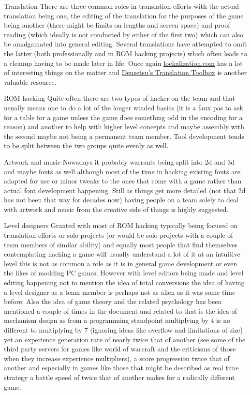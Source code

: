 \documentclass[
]{book}
\begin{document}
Translation There are three common roles in translation efforts with the actual translation being one, the editing of the translation for the purposes of the game being another (there might be limits on lengths and screen space) and proof reading (which ideally is not conducted by either of the first two) which can also be amalgamated into general editing. Several translations have attempted to omit the latter (both professionally and in ROM hacking projects) which often leads to a cleanup having to be made later in life. Once again \href{http://www.loekalization.com/mistakes.html}{loekalization.com} has a lot of interesting things on the matter and \href{http://gbatemp.net/topic/311523-densetsus-translation-toolbox/}{Densetsu's Translation Toolbox} is another valuable resource.

ROM hacking Quite often there are two types of hacker on the team and that usually means one to do a lot of the longer winded basics (it is a faux pas to ask for a table for a game unless the game does something odd in the encoding for a reason) and another to help with higher level concepts and maybe assembly with the second maybe not being a permanent team member. Tool development tends to be split between the two groups quite evenly as well.

Artwork and music Nowadays it probably warrants being split into 2d and 3d and maybe fonts as well although most of the time in hacking existing fonts are adapted for use or minor tweaks to the ones that come with a game rather than actual font development happening. Still as things get more detailed (not that 2d has not been that way for decades now) having people on a team solely to deal with artwork and music from the creative side of things is highly suggested.

Level designers Granted with most of ROM hacking typically being focused on translation efforts or solo projects (or would be solo projects with a couple of team members of similar ability) and equally most people that find themselves contemplating hacking a game will usually understand a lot of it at an intuitive level this is not as common a role as it is in general game development or even the likes of modding PC games. However with level editors being made and level editing happening not to mention the idea of total conversions the idea of having a level designer as a team member is perhaps not as alien as it was some time before. Also the idea of game theory and the related psychology has been mentioned a couple of times in the document and related to that is the idea of mechanism design as from a programming standpoint multiplying by 4 is no different to multiplying by 7 (ignoring ideas like overflow and limitations of size) yet an experience generation rate of nearly twice that of another (see some of the third party servers for games like world of warcraft and the criticisms of those when they increase experience multipliers), a score progression twice that of another and especially in games like those that might be described as real time strategy a battle speed of twice that of another makes for a radically different game.
\end{document}

